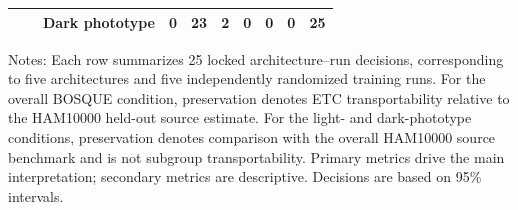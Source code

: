 \begin{table}[h!]
\begin{tabular}{lllrrrrrrr}
 &  & Dark phototype & 0 & 23 & 2 & 0 & 0 & 0 & 25 \\
\bottomrule
\end{tabular}
\begin{flushleft}
\footnotesize Notes: Each row summarizes 25 locked architecture--run decisions, corresponding to five architectures and five independently randomized training runs. For the overall BOSQUE condition, preservation denotes ETC transportability relative to the HAM10000 held-out source estimate. For the light- and dark-phototype conditions, preservation denotes comparison with the overall HAM10000 source benchmark and is not subgroup transportability. Primary metrics drive the main interpretation; secondary metrics are descriptive. Decisions are based on 95\% intervals.
\end{flushleft}
\end{table}
